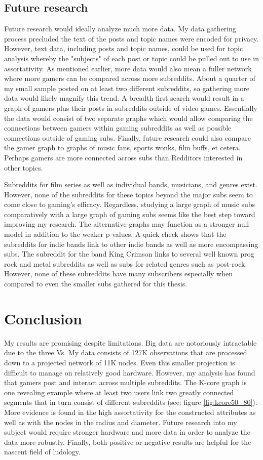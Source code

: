 \documentclass[12pt, a4paper]{article}
\begin{document}
\subsection{Future research}
Future research would ideally analyze much more data. My data gathering process precluded the text of the posts and topic names were encoded for privacy. However, text data, including posts and topic names, could be used for topic analysis whereby the "subjects" of each post or topic could be pulled out to use in assortativity. As mentioned earlier, more data would also mean a fuller network where more gamers can be compared across more subreddits. About a quarter of my small sample posted on at least two different subreddits, so gathering more data would likely magnify this trend. A breadth first search would result in a graph of gamers plus their posts in subreddits outside of video games. Essentially the data would consist of two separate graphs which would allow comparing the connections between gamers within gaming subreddits as well as possible connections outside of gaming subs. Finally, future research could also compare the gamer graph to graphs of music fans, sports wonks, film buffs, et cetera. Perhaps gamers are more connected across subs than Redditors interested in other topics.

Subreddits for film series as well as individual bands, musicians, and genres exist. However, none of the subreddits for these topics beyond the major subs seem to come close to gaming's efficacy. Regardless, studying a large graph of music subs comparatively with a large graph of gaming subs seems like the best step toward improving my research. The alternative graphs may function as a stronger null model in addition to the weaker p-values. A quick check shows that the subreddits for indie bands link to other indie bands as well as more encompassing subs. The subreddit for the band King Crimson links to several well known prog rock and metal subreddits as well as subs for related genres such as post-rock. However, none of these subreddits have many subscribers especially when compared to even the smaller subs gathered for this thesis.

\section{Conclusion}
My results are promising despite limitations. Big data are notoriously intractable due to the three Vs. My data consists of 127K observations that are processed down to a projected network of 11K nodes. Even this smaller projection is difficult to manage on relatively good hardware. However, my analysis has found that gamers post and interact across multiple subreddits. The K-core graph is one revealing example where at least two users link two greatly connected segments that in turn consist of different subreddits (see: figure \ref{fig:kcore50_80}). More evidence is found in the high assortativity for the constructed attributes as well as with the nodes in the radius and diameter. Future research into my subject would require stronger hardware and more data in order to analyze the data more robustly. Finally, both positive or negative results are helpful for the nascent field of ludology.

\printbibliography
\end{document}
